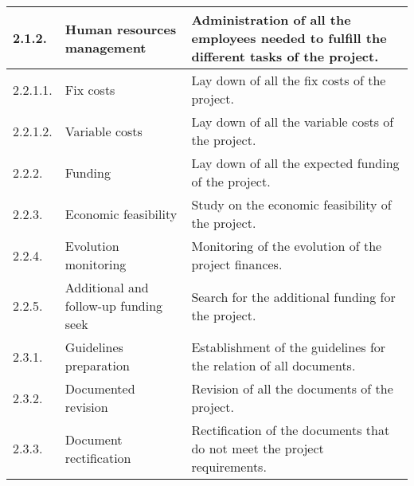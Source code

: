 \begin{longtable}[H]{l >{\raggedright\arraybackslash}p{4cm} p{8cm}}
	\midrule
	
	2.1.2. & Human resources management & Administration of all the employees needed to fulfill the different tasks of the project.\vspace{0.2cm} \\
	
	\midrule
	
	2.2.1.1. & Fix costs & Lay down of all the fix costs of the project.\vspace{0.2cm} \\
	
	\midrule
	
	2.2.1.2. & Variable costs & Lay down of all the variable costs of the project.\vspace{0.2cm} \\
	
	\midrule
	
	2.2.2. & Funding & Lay down of all the expected funding of the project.\vspace{0.2cm} \\
	
	\midrule
	
	2.2.3. & Economic feasibility & Study on the economic feasibility of the project.\vspace{0.2cm} \\
	
	\midrule
	
	2.2.4. & Evolution monitoring & Monitoring of the evolution of the project finances.\vspace{0.2cm} \\
	
	\midrule
	
	2.2.5. & Additional and follow-up funding seek & Search for the additional funding for the project.\vspace{0.2cm} \\
	
	\midrule
	
	2.3.1. & Guidelines preparation & Establishment of the guidelines for the relation of all documents.\vspace{0.2cm} \\
	
	\midrule
	
	2.3.2. & Documented revision & Revision of all the documents of the project.\vspace{0.2cm} \\
	
	\midrule
	
	2.3.3. & Document rectification & Rectification of the documents that do not meet the project requirements.\vspace{0.2cm} \\
	

\end{longtable}
